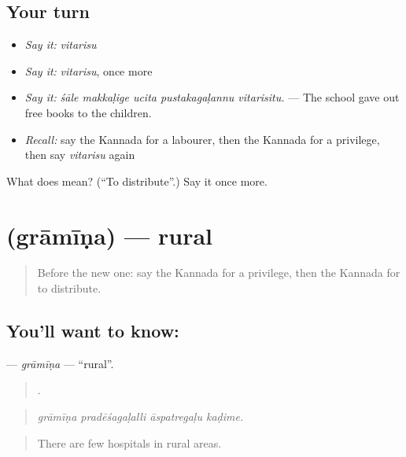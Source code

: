 \subsection*{Your turn}
\begin{itemize}
\raggedright
  \item \emph{Say it:} \emph{vitarisu}
  \item \emph{Say it:} \emph{vitarisu}, once more
  \item \emph{Say it:} \emph{śāle makkaḷige ucita pustakagaḷannu vitarisitu.} — The school gave out free books to the children.
  \item \emph{Recall:} say the Kannada for a labourer, then the Kannada for a privilege, then say \emph{vitarisu} again
\end{itemize}

\begin{tcolorbox}[breakable,colback=teal!4,colframe=teal!35!black,title={Before you move on}]
What does  mean? (\textquotedblleft{}To distribute\textquotedblright{}.) Say it once more.
\end{tcolorbox}
\section[\texorpdfstring{\kn{ಗ್ರಾಮೀಣ} (grāmīṇa)}{ಗ್ರಾಮೀಣ (grāmīṇa)}]{ (grāmīṇa) — rural}

\label{lesson:KA-C399-gramina}



\begin{quote}
Before the new one: say the Kannada for a privilege, then the Kannada for to distribute.
\end{quote}

\subsection*{You'll want to know: }
\textbf{} — \emph{grāmīṇa} — \textquotedblleft{}rural\textquotedblright{}.

\begin{quote}
   .
\end{quote}

\begin{quote}
\emph{grāmīṇa pradēśagaḷalli āspatregaḷu kaḍime.}
\end{quote}

\begin{quote}
There are few hospitals in rural areas.
\end{quote}

